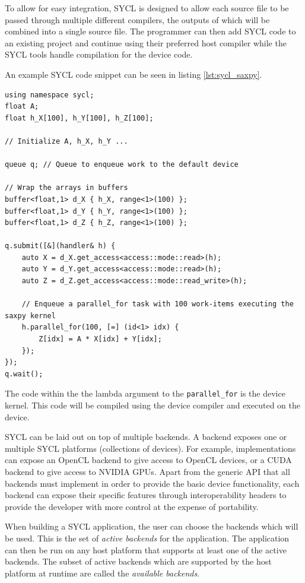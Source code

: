 To allow for easy integration, SYCL is designed to allow each source file to be passed through multiple different compilers, the outputs of which will be combined into a single source file. The programmer can then add SYCL code to an existing project and continue using their preferred host compiler while the SYCL tools handle compilation for the device code.

An example SYCL code snippet can be seen in listing \ref{lst:sycl_saxpy}.

\begin{lstlisting}[style=CStyle, caption=SYCL saxpy example, float, floatplacement=H, label={lst:sycl_saxpy}]
using namespace sycl;
float A;
float h_X[100], h_Y[100], h_Z[100];

// Initialize A, h_X, h_Y ...

queue q; // Queue to enqueue work to the default device

// Wrap the arrays in buffers
buffer<float,1> d_X { h_X, range<1>(100) };
buffer<float,1> d_Y { h_Y, range<1>(100) };
buffer<float,1> d_Z { h_Z, range<1>(100) };

q.submit([&](handler& h) {
    auto X = d_X.get_access<access::mode::read>(h);
    auto Y = d_Y.get_access<access::mode::read>(h);
    auto Z = d_Z.get_access<access::mode::read_write>(h);

    // Enqueue a parallel_for task with 100 work-items executing the saxpy kernel
    h.parallel_for(100, [=] (id<1> idx) {
        Z[idx] = A * X[idx] + Y[idx];
    });
});
q.wait();
\end{lstlisting}

The code within the the lambda argument to the \texttt{parallel\_for} is the device kernel. This code will be compiled using the device compiler and executed on the device.

SYCL can be laid out on top of multiple backends. A backend exposes one or multiple SYCL platforms (collections of devices). For example, implementations can expose an OpenCL backend to give access to OpenCL devices, or a CUDA backend to give access to NVIDIA GPUs. Apart from the generic API that all backends must implement in order to provide the basic device functionality, each backend can expose their specific features through interoperability headers to provide the developer with more control at the expense of portability.

When building a SYCL application, the user can choose the backends which will be used. This is the set of \textit{active backends} for the application. The application can then be run on any host platform that supports at least one of the active backends. The subset of active backends which are supported by the host platform at runtime are called the \textit{available backends}.

